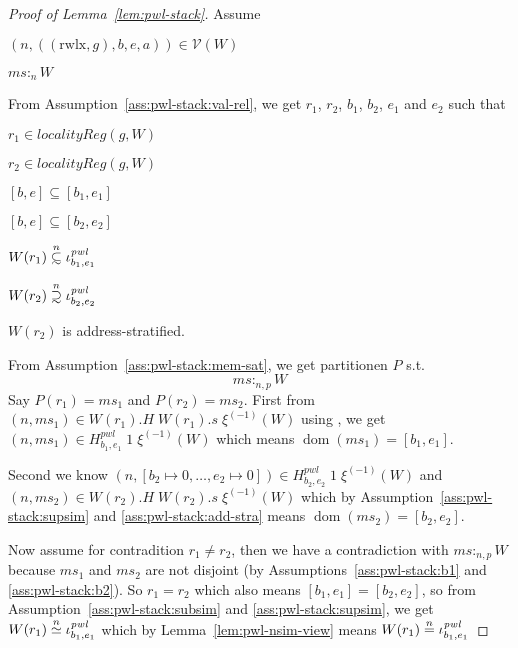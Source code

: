 \documentclass[a4paper]{article}
\newcommand{\nequal}[1][n]{\stackrel{\tiny{#1}}{=}}
\renewcommand{\nsim}[1][n]{\stackrel{\tiny{#1}}{\simeq}}
\newcommand\subsetsim{\mathrel{\ooalign{\raise.2ex\hbox{$\subset$}\cr
      \hidewidth\lower.8ex\hbox{\scalebox{0.9}{$\sim$}}\hidewidth\cr}}}
\newcommand\supsetsim{\mathrel{\ooalign{\raise.2ex\hbox{$\supset$}\cr
      \hidewidth\lower.8ex\hbox{\scalebox{0.9}{$\sim$}}\hidewidth\cr}}}
\newcommand{\nsubsim}[1][n]{\stackrel{\tiny{#1}}{\subsetsim}}
\newcommand{\nsupsim}[1][n]{\stackrel{\tiny{#1}}{\supsetsim}}
\DeclareMathOperator{\dom}{dom}
\newcommand{\var}[1]{\mathit{#1}}
\newcommand{\hs}{\var{ms}}
\newcommand{\ms}{\hs}
\newcommand{\gl}{\var{g}}
\newcommand{\heap}{\var{mem}}
\newcommand{\pwl}{\var{pwl}}
\newcommand{\heapSat}[3][\heap]{#1 :_{#2} #3}
\newcommand{\memSat}[3][n]{\heapSat[#2]{#1}{#3}}
\newcommand{\asmType}{\plaindom{AsmType}}
\newcommand{\plaindom}[1]{\mathrm{#1}}
\newcommand{\intr}[2]{\mathcal{#1}}
\newcommand{\valueintr}[1]{\intr{V}{#1}}
\newcommand{\stdvr}{\valueintr{\asmType}}
\newcommand{\npair}[2][n]{\left(#1,#2 \right)}
\newcommand{\plainperm}[1]{\mathrm{#1}}
\newcommand{\rwlx}{\plainperm{rwlx}}
\newcommand{\localityReg}{\var{localityReg}}
\begin{document}
\begin{proof}[Proof of Lemma~\ref{lem:pwl-stack}]
  Assume
  \begin{enumproof}
    \item $\npair{((\rwlx, \gl),b,e,a)} \in \stdvr(W)$ \label{ass:pwl-stack:val-rel}
    \item $\memSat{\ms}{W}$ \label{ass:pwl-stack:mem-sat}
  \end{enumproof}
  From Assumption~\ref{ass:pwl-stack:val-rel}, we get $r_1$, $r_2$, $b_1$, $b_2$, $e_1$ and $e_2$ such that
  \begin{enumproof}[resume]
    \item $r_1 \in \localityReg(\gl,W)$
    \item $r_2 \in \localityReg(\gl,W)$
    \item $[b,e] \subseteq [b_1,e_1]$\label{ass:pwl-stack:b1}
    \item $[b,e] \subseteq [b_2,e_2]$ \label{ass:pwl-stack:b2}
    \item $W(r_1) \nsubsim \iota^\pwl_{b_1,e_1}$ \label{ass:pwl-stack:subsim}
    \item $W(r_2) \nsupsim \iota^\pwl_{b_2,e_2}$ \label{ass:pwl-stack:supsim}
    \item $W(r_2)$ is address-stratified. \label{ass:pwl-stack:add-stra}
  \end{enumproof}
From Assumption~\ref{ass:pwl-stack:mem-sat}, we get partitionen $P$ s.t.
\[
  \memSat[n,p]{\ms}{W}
\]
Say $P(r_1) = \ms_1$ and $P(r_2) = \ms_2$. First from $\npair{\ms_1} \in W(r_1).H\;W(r_1).s\;\xi^{(-1)}(W)$ using \label{ass:pwl-stack:subsim}, we get $\npair{\ms_1} \in H^\pwl_{b_1,e_1}\;1\;\xi^{(-1)}(W)$ which means $\dom(\ms_1) = [b_1,e_1]$.

Second we know $\npair{[b_2 \mapsto 0, \dots , e_2 \mapsto 0]} \in H^\pwl_{b_2,e_2}\;1\;\xi^{(-1)}(W)$ and $\npair{\ms_2} \in W(r_2).H\;W(r_2).s\;\xi^{(-1)}(W)$ which by Assumption~\ref{ass:pwl-stack:supsim} and \ref{ass:pwl-stack:add-stra} means $\dom(\ms_2) = [b_2,e_2]$.

Now assume for contradition $r_1 \neq r_2$, then we have a contradiction with $\memSat[n,p]{\ms}{W}$ because $\ms_1$ and $\ms_2$ are not disjoint (by Assumptions~\ref{ass:pwl-stack:b1} and \ref{ass:pwl-stack:b2}). So $r_1=r_2$ which also means $[b_1,e_1] = [b_2,e_2]$, so from Assumption~\ref{ass:pwl-stack:subsim} and \ref{ass:pwl-stack:supsim}, we get $W(r_1) \nsim \iota^\pwl_{b_1,e_1}$ which by Lemma~\ref{lem:pwl-nsim-view} means $W(r_1) \nequal \iota^\pwl_{b_1,e_1}$
\end{proof}
\end{document}
